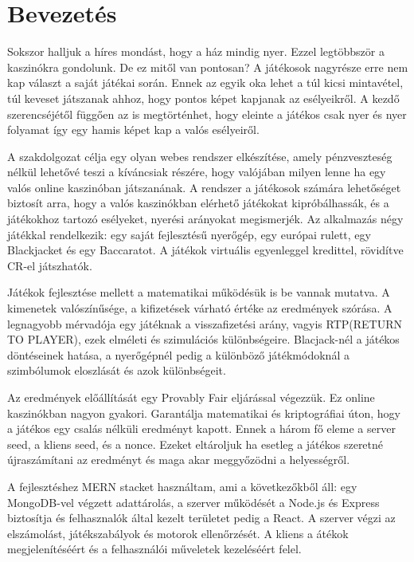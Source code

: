 \chapter{Bevezetés}

Sokszor halljuk a híres mondást, hogy a ház mindig nyer. Ezzel legtöbbször a kaszinókra gondolunk. De ez mitől van pontosan?
A játékosok nagyrésze erre nem kap választ a saját játékai során. Ennek az egyik oka lehet a túl kicsi mintavétel, túl keveset játszanak ahhoz, hogy
 pontos képet kapjanak az esélyeikről. A kezdő szerencséjétől függően az is megtörténhet, hogy eleinte a játékos csak nyer és nyer folyamat így egy hamis képet kap
 a valós esélyeiről.

A szakdolgozat célja egy olyan webes rendszer elkészítése, amely pénzveszteség nélkül lehetővé teszi a kíváncsiak részére, hogy valójában milyen lenne ha egy valós online
kaszinóban játszanának. A rendszer a játékosok számára lehetőséget biztosít arra, hogy a valós kaszinókban elérhető játékokat kipróbálhassák, és a játékokhoz tartozó esélyeket, nyerési arányokat megismerjék.
Az alkalmazás négy játékkal rendelkezik: egy saját fejlesztésű nyerőgép, egy európai rulett, egy Blackjacket és egy Baccaratot. A játékok virtuális egyenleggel kredittel, rövidítve CR-el
játszhatók.

Játékok fejlesztése mellett a matematikai működésük is be vannak mutatva. A kimenetek valószínűsége, a kifizetések várható értéke az eredmények szórása. A legnagyobb mérvadója 
egy játéknak a visszafizetési arány, vagyis RTP(RETURN TO PLAYER), ezek elméleti és szimulációs különbségeire. Blacjack-nél a játékos döntéseinek hatása, a nyerőgépnél pedig a különböző játékmódoknál
a szimbólumok eloszlását és azok különbségeit.

Az eredmények előállítását egy Provably Fair eljárással végezzük. Ez online kaszinókban nagyon gyakori. Garantálja matematikai és kriptográfiai úton, hogy a játékos egy csalás nélküli eredményt
kapott. Ennek a három fő eleme a server seed, a kliens seed, és a nonce. Ezeket eltároljuk ha esetleg a játékos szeretné újraszámítani az eredményt és maga akar meggyőzödni a
helyességről.

A fejlesztéshez MERN stacket használtam, ami a következőkből áll: egy MongoDB-vel végzett adattárolás, a szerver működését a Node.js és Express biztosítja és felhasznalók által kezelt
területet pedig a React. A szerver végzi az elszámolást, játékszabályok és motorok ellenőrzését. A kliens a átékok megjelenítéséért és a felhasználói műveletek kezeléséért felel.

